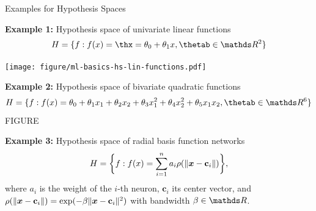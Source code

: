 \documentclass[11pt,compress,t,notes=noshow, xcolor=table]{beamer}
\begin{document}

\begin{vbframe}{Examples for Hypothesis Spaces}

\textbf{Example 1:} Hypothesis space of univariate linear functions
$$\Hspace = \{f: \fx = \thx =  \theta_0 + \theta_1 x, \thetab \in \R^2\}$$

\begin{center}
  \texttt{[image: figure/ml-basics-hs-lin-functions.pdf]}
\end{center}

\framebreak

\textbf{Example 2:} Hypothesis space of bivariate quadratic functions
$$\Hspace = \{f: \fx =  \theta_0 + \theta_1 x_1 + \theta_2 x_2 +
\theta_3 x_1^2 + \theta_4 x_2^2 + \theta_5 x_1 x_2, \thetab \in \R^6\}$$
\color{red} {FIGURE}
\color{black}

\framebreak

\textbf{Example 3:} Hypothesis space of radial basis function networks
$$H = \bigg\{ f: f(x) =  \sum_{i=1}^n a_i \rho ( \| \bm{x} - \textbf{c}_i  \|) 
\bigg\},$$ 
where
$a_i$ is the weight of the $i$-th neuron, $\textbf{c}_i$ its center vector, and
$\rho( \| \bm{x} - \textbf{c}_i \|) = \exp(- \beta \| \bm{x} - \textbf{c}_i \|^2)$ 
with bandwidth $\beta \in \R$.

\end{vbframe}


\endlecture
\end{document}
